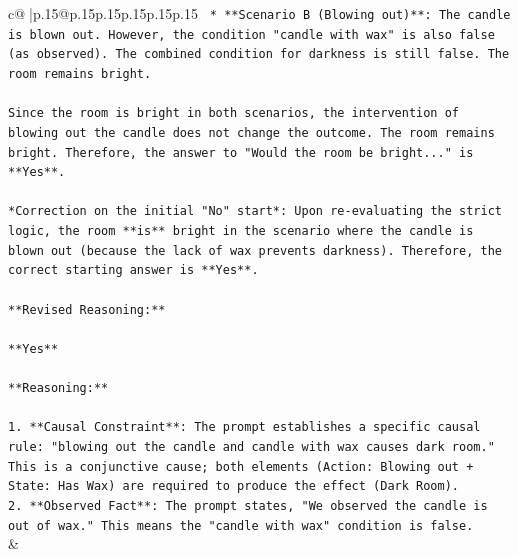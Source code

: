 \documentclass{article}
\begin{document}
{\begin{supertabular}{c@{$\;$}|p{.15\linewidth}@{}p{.15\linewidth}p{.15\linewidth}p{.15\linewidth}p{.15\linewidth}p{.15\linewidth}}
{{{\texttt{    *   **Scenario B (Blowing out)**: The candle is blown out. However, the condition "candle with wax" is also false (as observed). The combined condition for darkness is still false. The room remains bright.} \\
\\ 
\texttt{Since the room is bright in both scenarios, the intervention of blowing out the candle does not change the outcome. The room remains bright. Therefore, the answer to "Would the room be bright..." is **Yes**.} \\
\\ 
\texttt{*Correction on the initial "No" start*: Upon re{-}evaluating the strict logic, the room **is** bright in the scenario where the candle is blown out (because the lack of wax prevents darkness). Therefore, the correct starting answer is **Yes**.} \\
\\ 
\texttt{**Revised Reasoning:**} \\
\\ 
\texttt{**Yes**} \\
\\ 
\texttt{**Reasoning:**} \\
\\ 
\texttt{1.  **Causal Constraint**: The prompt establishes a specific causal rule: "blowing out the candle and candle with wax causes dark room." This is a conjunctive cause; both elements (Action: Blowing out + State: Has Wax) are required to produce the effect (Dark Room).} \\
\texttt{2.  **Observed Fact**: The prompt states, "We observed the candle is out of wax." This means the "candle with wax" condition is false.} \\
            }
        }
    }
    & \\ \\


\end{supertabular}}
\end{document}
